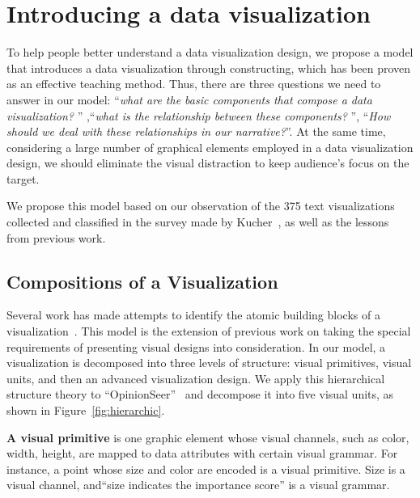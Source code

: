 \section{Introducing a data visualization} \label{analysis}
To help people better understand a data visualization design, we propose a model that introduces a data visualization through constructing, which has been proven as an effective teaching method\cite{huron_constructive_2014, chapman_constructive_1988}. Thus, there are three questions we need to answer in our model: ``\textit{what are the basic components that compose a data visualization? }'' ,``\textit{what is the relationship between these components? }'', ``\textit{How should we deal with these relationships in our narrative?}''. At the same time, considering a large number of graphical elements employed in a data visualization design, we should eliminate the visual distraction to keep audience's focus on the target.

We propose this model based on our observation of the 375 text visualizations collected and classified in the survey made by Kucher~\cite{kucher2015text}, as well as the lessons from previous work. 

\subsection{Compositions of a Visualization}\label{compositions}
Several work has made attempts to identify the atomic building blocks of a visualization~\cite{mendez_ivolver:_2016, bertin1983semiology}. This model is the extension of previous work on taking the special requirements of presenting visual designs into consideration. In our model, a visualization is decomposed into three levels of structure: visual primitives, visual units, and then an advanced visualization design. 
We apply this hierarchical structure theory to ``OpinionSeer''~\cite{wu_opinionseer:_2010} and decompose it into five visual units, as shown in Figure~\ref{fig:hierarchic}. 

\noindent
\textbf{A visual primitive} is one graphic element whose visual channels, such as color, width, height, are mapped to data attributes with certain visual grammar.  For instance, a point whose size and color are encoded is a visual primitive. Size is a visual channel, and``size indicates the importance score'' is a visual grammar. 

